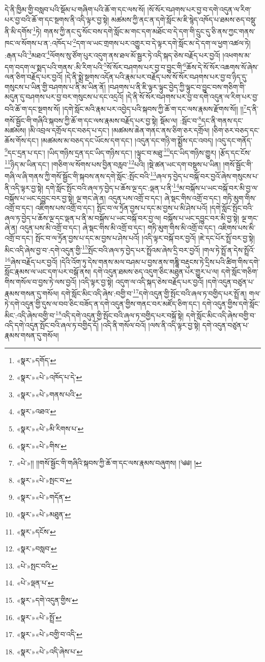 དེ་ནི་ཁྱིམ་གྱི་བསླབ་པའི་སྡོམ་པ་གཞིག་པའི་ཆོ་ག་དང་ལས་སོ། །སོ་སོར་བཤགས་པར་བྱ་བ་དགེ་འདུན་ལ་རིག་པར་བྱ་བའི་ཆོ་ག་དང་སྔགས་ནི་འདི་ལྟར་བྱ་སྟེ། མཚམས་ཀྱི་ནང་ན་དགེ་སློང་མ་ཇི་སྙེད་འཁོད་པ་ཐམས་ཅད་བསྡུ་ནི་མི་དགོས་\footnote{«སྣར་»དགོད་}ཏེ། གནས་ཀྱི་ནང་དུ་སོང་བས་དགེ་སློང་མ་གང་དག་མཐོང་བ་དེ་དག་གི་དྲུང་དུ་ཅི་ནས་ཀྱང་གནས་ཁང་ལ་སོགས་པ་ན་:འཁོད་པ་\footnote{«སྣར་»«པེ་»འཁོད་པ་དེ་}དག་ལ་ཡང་གྲགས་པར་འགྱུར་བ་དེ་ལྟར་དགེ་སློང་མ་དེ་དག་ལ་ཕྱག་འཚལ་ཏེ། :རྒན་པའི་\footnote{«སྣར་»«པེ་»གནས་པའི་}མཐའ་\footnote{«སྣར་»འཐའ་}ལོགས་སུ་ཙོག་པུར་འདུག་ནས་ཐལ་མོ་སྦྱར་ཏེ་འདི་སྐད་ཅེས་བརྗོད་པར་བྱའོ། །འཕགས་མ་དག་བདག་ལ་སྨད་པའི་གནས་:མི་རིག་པའི་\footnote{«སྣར་»«པེ་»མི་རིགས་པ་}སོ་སོར་བཤགས་པར་བྱ་བ་བྱུང་གི་\footnote{«སྣར་»«པེ་»གིས་}ཆོས་དེ་སོ་སོར་འཆགས་སོ་ཞེས་ལན་ཅིག་བརྗོད་པར་བྱའོ། །དེ་ནི་སྨྲེ་སྔགས་འདོན་པའི་རྣམ་པར་བརྗོད་པས་སོ་སོར་བཤགས་པར་བྱ་བ་ཉིད་དུ་གསུངས་པ་ཡིན་གྱི་བཤགས་པ་ནི་མ་ཡིན་ནོ། །བཤགས་པ་ནི་ཇི་ལྟར་ལྟུང་བྱེད་ཀྱི་ལྟུང་བ་བྱུང་བས་གཅིག་གི་མདུན་དུ་བཤགས་པར་བྱ་བར་གསུངས་པ་དང་འདྲའོ། །དེ་ནི་སོ་སོར་བཤགས་པར་བྱ་བ་དགེ་འདུན་ལ་རིག་པར་བྱ་བའི་ཆོ་ག་དང་སྔགས་སོ། །དགེ་སློང་མའི་རྣམ་པར་འབྱེད་པའི་སྐབས་ཀྱི་ཆོ་ག་དང་ལས་རྣམས་རྫོགས་སོ།། །།\footnote{«པེ་»།། །།གསོ་སྦྱོང་གི་གཞིའི་སྐབས་ཀྱི་ཆོ་ག་དང་ལས་རྣམས་བཞུགས། །༄༅། །}ད་ནི་གསོ་སྦྱོང་གི་གཞིའི་སྐབས་ཀྱི་ཆོ་ག་དང་ལས་རྣམས་བརྗོད་པར་བྱ་སྟེ། སྡོམ་ལ། :སྦོང་བ་\footnote{«སྣར་»«པེ་»སྤང་བ་}དང་ནི་གནས་དང་མཚམས། །མི་འབྲལ་དགྲོལ་དང་བཅད་པ་དང་། །མཚམས་ཆེན་གནང་ནས་ཅིག་ཅར་དགྲོལ། །ཅིག་ཅར་བཅད་དང་ཆོས་གོས་དང་། །མཚམས་མ་བཅད་དང་ཡོངས་དག་དང་། །འདུན་དང་གཉི་ག་སྨྱོས་དང་འབད། །འདུ་དང་གནོད་\footnote{«སྣར་»«པེ་»གདོན་}དང་དྲན་པ་དང་། །ཡིད་གཉིས་དྲན་དང་ཡིད་གཉིས་དང་། །ལྟུང་བ་མཐུ་\footnote{«སྣར་»«པེ་»མཐུན་}དང་ཡིད་གཉིས་གྱུར། །རྩོད་དང་ངོས་\footnote{«སྣར་»དངོས་}ཉིད་མ་ཡིན་དང་། །གཅིག་ལ་སོགས་པས་བྱིན་བརླབ་\footnote{«སྣར་»བསླབ་}པའི། །སྡེ་ཚན་ཡང་དག་བསྡུས་པ་ཡིན། །གསོ་སྦྱོང་གི་གཞི་ལ་ཞི་གནས་ཀྱི་གསོ་སྦྱོང་གི་སྐབས་ནས་དགེ་སློང་:སྤོང་བའི་\footnote{«པེ་»སྤང་བའི་}ཞལ་ཏ་བྱེད་པ་བསྐོ་བར་བྱའོ་ཞེས་གསུངས་པ་ནི་འདི་ལྟར་བྱ་སྟེ། དགེ་སློང་སྤོང་བའི་ཞལ་ཏ་བྱེད་པ་ཆོས་ལྔ་དང་:ལྡན་པ་ནི་\footnote{«པེ་»ལྡན་པ་}མ་བསྐོས་པ་ཡང་བསྐོ་བར་མི་བྱ་ལ་བསྐོས་པ་ཡང་དབྱུང་བར་བྱ་སྟེ། ལྔ་གང་ཞེ་ན། འདུན་པས་འགྲོ་བ་དང་། ཞེ་སྡང་གིས་འགྲོ་བ་དང་། གཏི་མུག་གིས་འགྲོ་བ་དང་། འཇིགས་པས་འགྲོ་བ་དང་། སྤོང་བ་ལ་ཏྲོན་བྱས་པ་དང་མ་བྱས་པ་མི་ཤེས་པའོ། །དགེ་སློང་སྤོང་བའི་ཞལ་ཏ་བྱེད་པ་ཆོས་ལྔ་དང་ལྡན་པ་ནི་མ་བསྐོས་པ་ཡང་བསྐོ་བར་བྱ་ལ། བསྐོས་པ་ཡང་དབྱུང་བར་མི་བྱ་སྟེ། ལྔ་གང་ཞེ་ན། འདུན་པས་མི་འགྲོ་བ་དང་། ཞེ་སྡང་གིས་མི་འགྲོ་བ་དང་། གཏི་མུག་གིས་མི་འགྲོ་བ་དང་། འཇིགས་པས་མི་འགྲོ་བ་དང་། སྤོང་བ་ལ་ཏྲོན་བྱས་པ་དང་མ་བྱས་པ་ཤེས་པའོ། །འདི་ལྟར་བསྐོ་བར་བྱའོ། །ཇེ་དང་པོར་སྤྲོ་བར་བྱ་སྟེ། མིང་འདི་ཞེས་བྱ་བ་:དགེ་འདུན་གྱི་\footnote{«སྣར་»དགེ་འདུན་གྱིས་}སྤོང་བའི་ཞལ་ཏ་བྱེད་པར་སྤྲོའམ་ཞེས་དྲི་བར་བྱའོ། །གལ་ཏེ་སྤྲོ་ན་དེས་སྤྲོའོ་\footnote{«སྣར་»«པེ་»སྤྲོ་}ཞེས་བརྗོད་པར་བྱའོ། །དེའི་འོག་ཏུ་དེས་གནས་མལ་བཤམ་པ་བྱས་ནས་གཎྜཱི་བརྡུངས་ཏེ་དྲིས་པའི་ཚིག་གིས་དགེ་སློང་རྣམས་ལ་ཡང་དག་པར་བསྒོ་ནས། དགེ་འདུན་ཐམས་ཅད་འདུག་ཅིང་མཐུན་པར་གྱུར་པ་ལ། དགེ་སློང་གཅིག་གིས་གསོལ་བ་བྱས་ཏེ་ལས་བྱའོ། །འདི་ལྟར་བྱ་སྟེ། འདུག་ལ་འདི་སྐད་ཅེས་བརྗོད་པར་བྱའོ། །དགེ་འདུན་བཙུན་པ་རྣམས་གསན་དུ་གསོལ། དགེ་སློང་མིང་འདི་ཞེས་:བགྱི་བ་\footnote{«སྣར་»«པེ་»བགྱི་བ་འདི་}དགེ་འདུན་གྱི་སྤོང་བའི་ཞལ་ཏ་བགྱིད་པར་སྤྲོ་ན། གལ་ཏེ་དགེ་འདུན་གྱི་དུས་ལ་བབ་ཅིང་བཟོད་ན་དགེ་འདུན་གྱིས་གནང་བར་མཛོད་ཅིག་དང་། དགེ་འདུན་གྱིས་དགེ་སློང་མིང་:འདི་ཞེས་བགྱི་བ་\footnote{«སྣར་»«པེ་»འདི་ཞེས་པ་}འདི་དགེ་འདུན་གྱི་སྤོང་བའི་ཞལ་ཏ་བགྱིད་པར་བསྐོ་སྟེ། དགེ་སློང་མིང་འདི་ཞེས་བགྱི་བ་འདི་དགེ་འདུན་སྤོང་བའི་ཞལ་ཏ་བགྱིད་དོ། །འདི་ནི་གསོལ་བའོ། །ལས་ནི་འདི་ལྟར་བྱ་སྟེ། དགེ་འདུན་བཙུན་པ་རྣམས་གསན་དུ་གསོལ། 